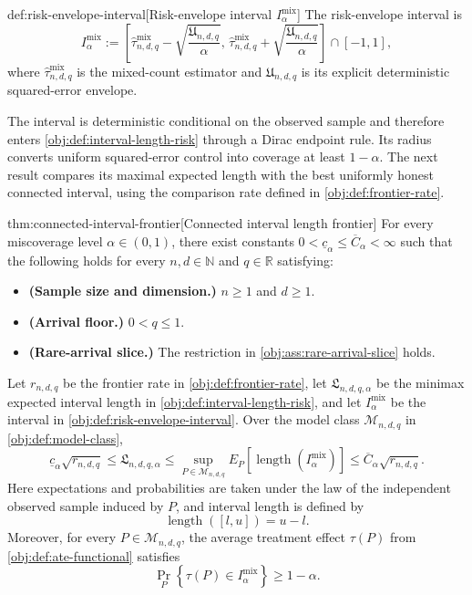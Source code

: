 \documentclass[11pt]{article}
\begin{document}
\begin{definitionv}{def:risk-envelope-interval}[Risk-envelope interval \(I^{\mathrm{mix}}_\alpha\)]
The risk-envelope interval is
\[
I^{\mathrm{mix}}_\alpha
:=
\left[
\widehat\tau^{\mathrm{mix}}_{n,d,q}
-
\sqrt{\frac{\mathfrak U_{n,d,q}}{\alpha}},
\,
\widehat\tau^{\mathrm{mix}}_{n,d,q}
+
\sqrt{\frac{\mathfrak U_{n,d,q}}{\alpha}}
\right]\cap[-1,1],
\]
where \(\widehat\tau^{\mathrm{mix}}_{n,d,q}\) is the mixed-count estimator and \(\mathfrak U_{n,d,q}\) is its explicit deterministic squared-error envelope.
\end{definitionv}

The interval  is deterministic conditional on the observed sample and therefore enters \cref{obj:def:interval-length-risk} through a Dirac endpoint rule. Its radius converts uniform squared-error control into coverage at least \(1-\alpha\). The next result compares its maximal expected length with the best uniformly honest connected interval, using the comparison rate  defined in \cref{obj:def:frontier-rate}.

\begin{theoremv}{thm:connected-interval-frontier}[Connected interval length frontier]
For every miscoverage level \(\alpha\in(0,1)\), there exist constants \(0<\underline c_\alpha\le\overline C_\alpha<\infty\) such that the following holds for every \(n,d\in\mathbb N\) and \(q\in\mathbb R\) satisfying:
\begin{itemize}
\item \textbf{(Sample size and dimension.)} \(n\ge1\) and \(d\ge1\).
\item \textbf{(Arrival floor.)} \(0<q\le1\).
\item \textbf{(Rare-arrival slice.)} The restriction in \cref{obj:ass:rare-arrival-slice} holds.
\end{itemize}
Let \(r_{n,d,q}\) be the frontier rate in \cref{obj:def:frontier-rate}, let \(\mathfrak L_{n,d,q,\alpha}\) be the minimax expected interval length in \cref{obj:def:interval-length-risk}, and let \(I^{\mathrm{mix}}_\alpha\) be the interval in \cref{obj:def:risk-envelope-interval}. Over the model class \(\mathcal M_{n,d,q}\) in \cref{obj:def:model-class},
\[
\underline c_\alpha\sqrt{r_{n,d,q}}
\le \mathfrak L_{n,d,q,\alpha}
\le \sup_{P\in\mathcal M_{n,d,q}}
E_P\!\left[\operatorname{length}(I^{\mathrm{mix}}_\alpha)\right]
\le \overline C_\alpha\sqrt{r_{n,d,q}}.
\]
Here expectations and probabilities are taken under the law of the independent observed sample induced by \(P\), and interval length is defined by
\[
\operatorname{length}([l,u])=u-l.
\]
Moreover, for every \(P\in\mathcal M_{n,d,q}\), the average treatment effect \(\tau(P)\) from \cref{obj:def:ate-functional} satisfies
\[
\Pr_P\!\left\{\tau(P)\in I^{\mathrm{mix}}_\alpha\right\}\ge1-\alpha.
\]
\end{theoremv}
\end{document}
